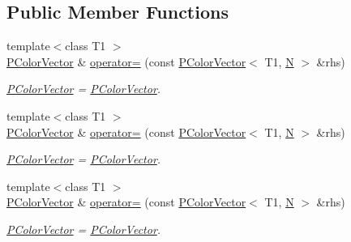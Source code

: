 \subsection*{Public Member Functions}
\begin{DoxyCompactItemize}
\item 
{\footnotesize template$<$class T1 $>$ }\\\mbox{\hyperlink{classENSEM_1_1PColorVector}{P\+Color\+Vector}} \& \mbox{\hyperlink{classENSEM_1_1PColorVector_ac5919a92dade0bb7763353ed7d05b8b2}{operator=}} (const \mbox{\hyperlink{classENSEM_1_1PColorVector}{P\+Color\+Vector}}$<$ T1, \mbox{\hyperlink{adat__devel_2lib_2hadron_2operator__name__util_8cc_a7722c8ecbb62d99aee7ce68b1752f337}{N}} $>$ \&rhs)
\begin{DoxyCompactList}\small\item\em \mbox{\hyperlink{classENSEM_1_1PColorVector}{P\+Color\+Vector}} = \mbox{\hyperlink{classENSEM_1_1PColorVector}{P\+Color\+Vector}}. \end{DoxyCompactList}\item 
{\footnotesize template$<$class T1 $>$ }\\\mbox{\hyperlink{classENSEM_1_1PColorVector}{P\+Color\+Vector}} \& \mbox{\hyperlink{classENSEM_1_1PColorVector_ac5919a92dade0bb7763353ed7d05b8b2}{operator=}} (const \mbox{\hyperlink{classENSEM_1_1PColorVector}{P\+Color\+Vector}}$<$ T1, \mbox{\hyperlink{adat__devel_2lib_2hadron_2operator__name__util_8cc_a7722c8ecbb62d99aee7ce68b1752f337}{N}} $>$ \&rhs)
\begin{DoxyCompactList}\small\item\em \mbox{\hyperlink{classENSEM_1_1PColorVector}{P\+Color\+Vector}} = \mbox{\hyperlink{classENSEM_1_1PColorVector}{P\+Color\+Vector}}. \end{DoxyCompactList}\item 
{\footnotesize template$<$class T1 $>$ }\\\mbox{\hyperlink{classENSEM_1_1PColorVector}{P\+Color\+Vector}} \& \mbox{\hyperlink{classENSEM_1_1PColorVector_ac5919a92dade0bb7763353ed7d05b8b2}{operator=}} (const \mbox{\hyperlink{classENSEM_1_1PColorVector}{P\+Color\+Vector}}$<$ T1, \mbox{\hyperlink{adat__devel_2lib_2hadron_2operator__name__util_8cc_a7722c8ecbb62d99aee7ce68b1752f337}{N}} $>$ \&rhs)
\begin{DoxyCompactList}\small\item\em \mbox{\hyperlink{classENSEM_1_1PColorVector}{P\+Color\+Vector}} = \mbox{\hyperlink{classENSEM_1_1PColorVector}{P\+Color\+Vector}}. \end{DoxyCompactList}\end{DoxyCompactItemize}
